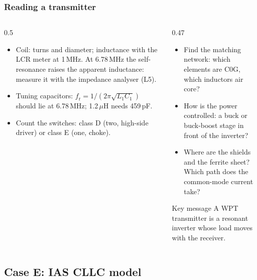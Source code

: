 \begin{frame}
	\frametitle{Reading a transmitter}
	\begin{columns}[T]
		\begin{column}{0.5\textwidth}
			\small
			\begin{itemize}
				\item Coil: turns and diameter; inductance with the LCR meter at 1\,MHz. At 6.78\,MHz the self-resonance raises the apparent inductance: measure it with the impedance analyser (L5).
				\item Tuning capacitors: $f_\mathrm{r}=1/(2\pi\sqrt{L_1C_1})$ should lie at 6.78\,MHz; 1.2\,$\mu$H needs 459\,pF.
				\item Count the switches: class D (two, high-side driver) or class E (one, choke).
			\end{itemize}
		\end{column}
		\begin{column}{0.47\textwidth}
			\small
			\begin{itemize}
				\item Find the matching network: which elements are C0G, which inductors air core?
				\item How is the power controlled: a buck or buck-boost stage in front of the inverter?
				\item Where are the shields and the ferrite sheet? Which path does the common-mode current take?
			\end{itemize}
			\begin{block}{Key message}
				A WPT transmitter is a resonant inverter whose load moves with the receiver.
			\end{block}
		\end{column}
	\end{columns}
\end{frame}

\subsection{Case E: IAS CLLC model}

